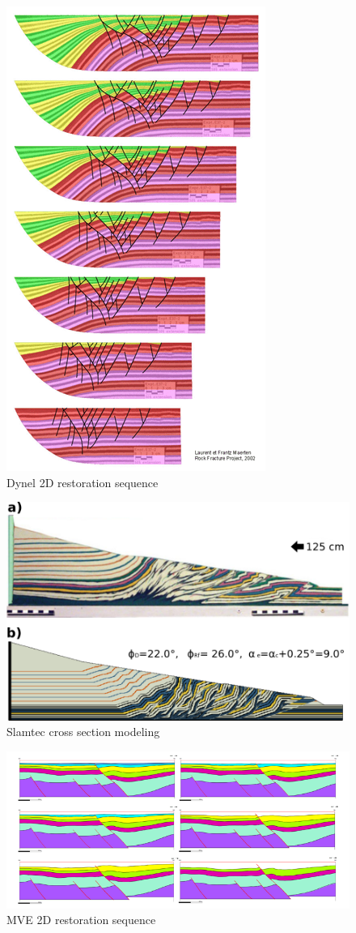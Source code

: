 \documentclass[12pt, a4paper]{memoir} %
\begin{document}
\begin{figure}[H]
	\centering
	\includegraphics[scale=0.5]{dynel2D.png}
	\caption{Dynel 2D restoration sequence}
\end{figure}

\begin{figure}[H]
	\centering
	\includegraphics[scale=0.5]{slamtec.png}
	\caption{Slamtec cross section modeling}
\end{figure}

\begin{figure}[H]
	\centering
	\includegraphics[scale=3]{mve2D.png}
	\caption{MVE 2D restoration sequence}
\end{figure}


\end{document}
